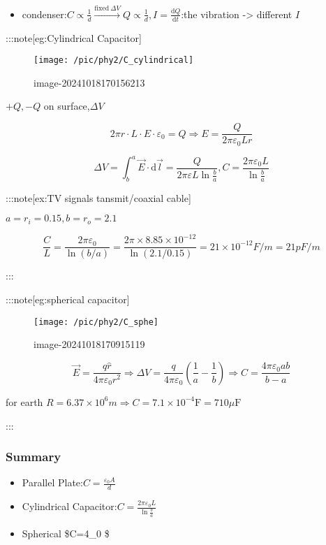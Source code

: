 \documentclass[
]{article}
\providecommand{\tightlist}{%
  \setlength{\itemsep}{0pt}\setlength{\parskip}{0pt}}
\begin{document}
\begin{itemize}
\tightlist
\item
  condenser:\(C \propto \frac{1}{d}\xrightarrow{\mathrm{fixed~}\Delta V} Q\propto\frac{1}{d},I=\frac{\mathrm{d} Q}{\mathrm d t}\):the
  vibration -\textgreater{} different \(I\)
\end{itemize}

:::note{[}eg:Cylindrical Capacitor{]}

\begin{figure}
\centering
\texttt{[image: /pic/phy2/C\_cylindrical]}
\caption{image-20241018170156213}
\end{figure}

\(+Q,-Q\) on surface,\(\Delta V\)

\[
2\pi r \cdot L\cdot E\cdot \varepsilon_0=Q\Rightarrow E=\frac{Q}{2\pi \varepsilon _0 Lr}
\]

\[
\Delta V=\int_{b}^a \vec E\cdot \mathrm d\vec l =\frac{Q}{2\pi \varepsilon L\ln \frac{b}{a}},C=\frac{2\pi \varepsilon _0 L}{\ln\frac{b}{a}}
\]

:::note{[}ex:TV signals tansmit/coaxial cable{]}

\(a=r_i=0.15,b=r_o=2.1\)

\[
\frac{C}{L}=\frac{2\pi\varepsilon_{0}}{\ln(b/a)}=\frac{2\pi\times8.85\times10^{-12}}{\ln(2.1/0.15)}=21\times10^{-12}F / m=21 pF / m
\]

:::

:::note{[}eg:spherical capacitor{]}

\begin{figure}
\centering
\texttt{[image: /pic/phy2/C\_sphe]}
\caption{image-20241018170915119}
\end{figure}

\[
\vec E=\frac{q\hat r}{4\pi \varepsilon _0 r^2}\Rightarrow \Delta V=\frac{q}{4\pi \varepsilon_0 }\left(\frac{1}{a}-\frac{1}{b}\right)\Rightarrow C=\frac{4\pi \varepsilon _0ab}{b-a}
\]

for earth
\(R=6.37\times 10^6 m\Rightarrow C=7.1\times 10^{-4}\mathrm F=710\mu \mathrm F\)

:::

\hypertarget{summary-1}{%
\subsubsection{Summary}\label{summary-1}}

\begin{itemize}
\tightlist
\item
  Parallel Plate:\(C=\frac{\varepsilon _0 A}{d}\)
\item
  Cylindrical
  Capacitor:\(C=\frac{2\pi \varepsilon _0 L}{\ln\frac{b}{a}}\)
\item
  Spherical \$C=4\pi \varepsilon\_0 \$
\end{itemize}
\end{document}
